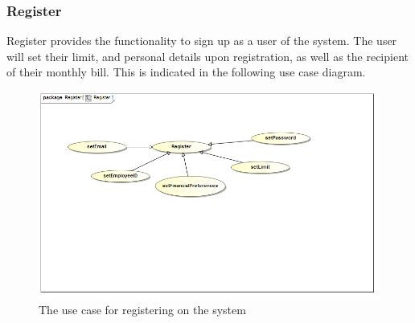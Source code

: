 \documentclass[a4paper,12pt]{article}
\begin{document}
\subsubsection{Register }
Register provides the functionality to sign up as a user of the system. The user will set their limit, and personal details upon registration, as well as the recipient of their monthly bill. This is indicated in the following use case diagram.
\begin{figure}[H]
  \centering
    \includegraphics[width=1.0\textwidth]{../diagrams/Register/registerUseCase.png}
    \caption{The use case for registering on the system} 
\end{figure}
\end{document}
